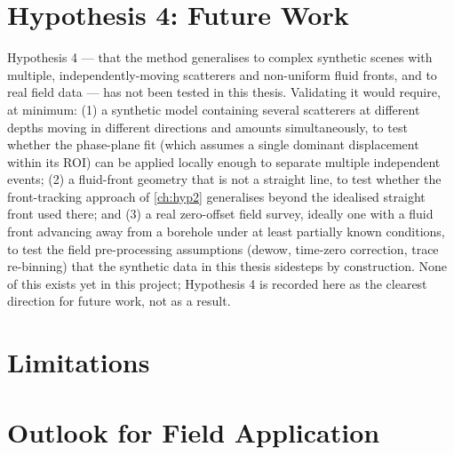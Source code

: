 \section{Hypothesis 4: Future Work}
\label{sec:disc-hyp4}

Hypothesis 4 --- that the method generalises to complex synthetic scenes
with multiple, independently-moving scatterers and non-uniform fluid
fronts, and to real field data --- has not been tested in this thesis.
Validating it would require, at minimum: (1) a synthetic model containing
several scatterers at different depths moving in different directions and
amounts simultaneously, to test whether the phase-plane fit (which assumes
a single dominant displacement within its ROI) can be applied locally
enough to separate multiple independent events; (2) a fluid-front geometry
that is not a straight line, to test whether the front-tracking approach of
\cref{ch:hyp2} generalises beyond the idealised straight front used there;
and (3) a real zero-offset field survey, ideally one with a fluid front
advancing away from a borehole under at least partially known conditions,
to test the field pre-processing assumptions (dewow, time-zero correction,
trace re-binning) that the synthetic data in this thesis sidesteps by
construction. None of this exists yet in this project; Hypothesis 4 is
recorded here as the clearest direction for future work, not as a result.

\section{Limitations}


\section{Outlook for Field Application}

